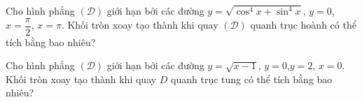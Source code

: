 \begin{bt}%
	Cho hình phẳng $(\mathcal{D})$ giới hạn bởi các đường $y=\sqrt{\cos^4x+\sin^4x} $, $y=0$, $x=\dfrac{\pi}{2}$, $x=\pi$. Khối tròn xoay tạo thành khi quay $(\mathcal{D})$ quanh trục hoành có thể tích bằng bao nhiêu?
\end{bt}
\begin{bt}%
	Cho hình phẳng $(\mathcal{D})$ giới hạn bởi các đường $y=\sqrt{x-1}$, $y=0$,$y=2$, $x=0$. Khối tròn xoay tạo thành khi quay $D$ quanh trục tung có thể tích bằng bao nhiêu?
\end{bt}

